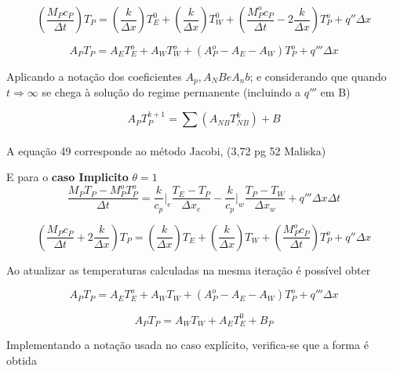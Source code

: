\documentclass[]{article}
\begin{document}
\begin{equation}
	\left( \frac{M_P c_P}{\Delta t} \right) T_P =
	\left( \frac{k}{\Delta x} \right) T_E^0 +
	\left( \frac{k}{\Delta x} \right) T_W^0 +
	\left( \frac{M_P^o c_P}{\Delta t} - 2 \frac{k}{\Delta x} \right) T_P^o +
	q'' \Delta x
\end{equation}

\begin{equation}
	A_P T_P = A_E T_E^o + A_W T_W^o + \left( A_P^o - A_E - A_W \right) T_P^o + q''' \Delta x
\end{equation}


Aplicando a notação dos coeficientes $A_p, A_NB e A_nb$; e considerando que quando $t\Longrightarrow \infty$ se chega à solução do regime permanente (incluindo a  $q'''$ em B)

\begin{equation}
	A_P T_P^{k+1} = \sum \left( A_{NB} T_{NB} ^k \right) + B
\end{equation}\\

A equação 49 corresponde ao método Jacobi, (3,72 pg 52 Maliska)



E para o\textbf{ caso Implicito } $\theta = 1$
\begin{equation}
	\frac{M_P T_P - M_P^o T_P^o}{\Delta t} =
	\frac{k}{c_p} \bigg|_e \frac{T_E - T_P}{\Delta x_e} -
	\frac{k}{c_p} \bigg|_w \frac{T_P - T_W}{\Delta x_w} + q'''  \Delta x \Delta t 
\end{equation}

\begin{equation}
	\left( \frac{M_P c_P}{\Delta t} + 2 \frac{k}{\Delta x} \right) T_P =
	\left( \frac{k}{\Delta x} \right) T_E +
	\left( \frac{k}{\Delta x} \right) T_W +
	\left( \frac{M_P^o c_P}{\Delta t} \right) T_P^o +
	q'' \Delta x
\end{equation}

Ao atualizar as temperaturas calculadas na mesma iteração é possível obter

\begin{equation}
	A_P T_P = A_E T_E^o + A_W T_W + \left( A_P^o - A_E - A_W \right) T_P^o + q''' \Delta x
\end{equation}

\begin{equation}
	A_P T_P = A_W T_W + A_E T_E^0 + B_P
\end{equation}

Implementando a notação usada no caso explícito, verifica-se que a forma é obtida
\end{document}

